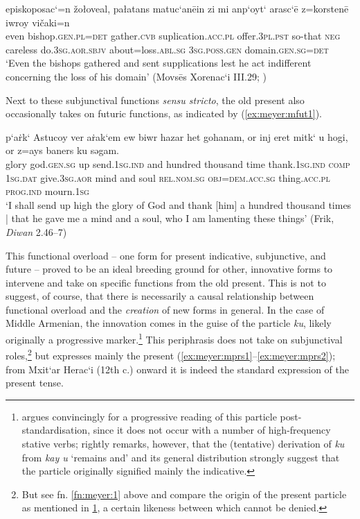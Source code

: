 \documentclass[output=paper,colorlinks,citecolor=brown]{langscibook}
\begin{document}
	\ea \label{ex:meyer:osubj3}
	 episkoposac‘=n žołoveal, pałatans matuc‘anēin zi mi anp‘oyt‘ arasc‘ē z=korstenē iwroy vičaki=n\\	
	even bishop.\textsc{gen.pl=det} gather.\textsc{cvb}  suplication.\textsc{acc.pl} offer.\textsc{3pl.pst} so-that \textsc{neg} careless do.\textsc{3sg.aor.sbjv} about=loss.\textsc{abl.sg} \textsc{3sg.poss.gen} domain.\textsc{gen.sg=det}\\
	\glt ‘Even the bishops gathered and sent supplications lest he act indifferent concerning the loss of his domain’ (Movsēs Xorenac‘i III.29; \citealt{Matenagirk2})
	\z {}

	Next to these subjunctival functions \textit{sensu stricto}, the old present also occasionally takes on futuric functions, as indicated by (\ref{ex:meyer:mfut1}).
	
	\ea \label{ex:meyer:mfut1}
	\gll p‘aṙk‘ Astucoy ver aṙak‘em ew biwr hazar het gohanam, or inj eret mitk‘ u hogi, or z=ays baners ku səgam.\\
	glory god.\textsc{gen.sg} up send.\textsc{1sg.ind} and hundred thousand time thank.\textsc{1sg.ind} \textsc{comp} \textsc{1sg.dat} give.\textsc{3sg.aor} mind and soul \textsc{rel.nom.sg} \textsc{obj=dem.acc.sg} thing.\textsc{acc.pl} \textsc{prog.ind} mourn.\textsc{1sg}\\
	\glt ‘I shall send up high the glory of God and thank [him] a hundred thousand times | that he gave me a mind and a soul, who I am lamenting these things’ (Frik, \textit{Diwan} 2.46–7)
	\z {}
	
	This functional overload – one form for present indicative, subjunctive, and future – proved to be an ideal breeding ground for other, innovative forms to intervene and take on specific functions from the old present. This is not to suggest, of course, that there is necessarily a causal relationship between functional overload and the \textit{creation} of new forms in general. In the case of Middle Armenian, the innovation comes in the guise of the particle \textit{ku}, likely originally a progressive marker.\footnote{\label{fn:meyer:2} \citet{Vaux1995} argues convincingly for a progressive reading of this particle post-standardisation, since it does not occur with a number of high-frequency stative verbs; \citet[307–309]{Karst1901} rightly remarks, however, that the (tentative) derivation of \textit{ku} from \textit{kay u} ‘remains and’ and its general distribution strongly suggest that the particle originally signified mainly the indicative.} This periphrasis does not take on subjunctival roles,\footnote{But see fn. \ref{fn:meyer:1} above and compare the origin of the present particle as mentioned in \ref{fn:meyer:2}, a certain likeness between which cannot be denied.} but expresses mainly the present (\ref{ex:meyer:mprs1}–\ref{ex:meyer:mprs2}); from Mxit‘ar Herac‘i (12th c.) onward it is indeed the standard expression of the present tense.
	
\end{document}
